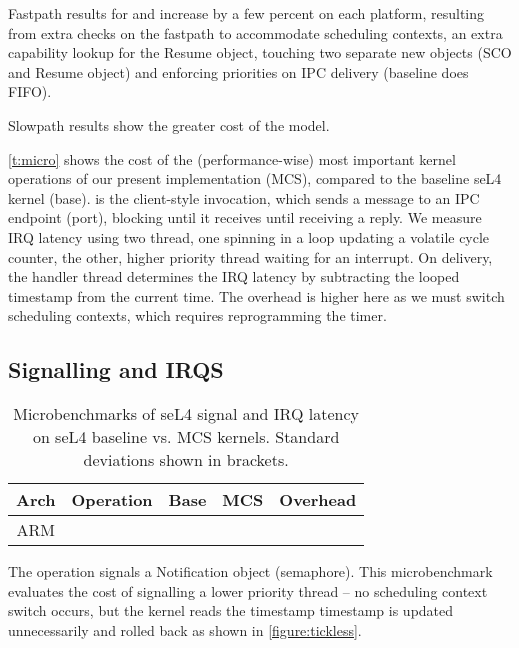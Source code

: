 Fastpath results for \call and \replyrecv increase by a few percent on each platform,
resulting from extra checks on the fastpath to
accommodate scheduling contexts, an extra capability lookup for the Resume object, touching two
separate new objects (\gls{SCO} and Resume object) and enforcing priorities
on IPC delivery (baseline does \gls{FIFO}).

Slowpath results show the greater cost of the model. 

\autoref{t:micro} shows the cost of the (performance-wise) most
important kernel operations of our present implementation (MCS), compared to
the baseline seL4 kernel (base).  is the client-style
invocation, which sends a message to an IPC endpoint (port),
 blocking until it receives until receiving a reply.
We measure IRQ latency using two thread, one spinning in a loop
updating a volatile cycle counter, the other, higher priority thread
waiting for an interrupt. On delivery, the handler thread determines the
IRQ latency by subtracting the
looped timestamp from the current time. The overhead is higher here as we must switch scheduling
contexts, which requires reprogramming the timer.

\subsection{Signalling and IRQS}

\begin{table}[h]\centering
\begin{tabular}{|c|l| r@{~}l | r@{~}l |r@{~}r|}\hline
\textbf{Arch}           & \multicolumn{1}{c|}{\textbf{Operation}}
                                & \multicolumn{2}{c|}{\textbf{Base}}
                                & \multicolumn{2}{c|}{\textbf{MCS}}
                                & \multicolumn{2}{c|}{\textbf{Overhead}} \\ \hline
\multirow{3}{*}{ARM}

\hline
\multirow{3}{*}{x64}

\hline
\end{tabular}
\caption{Microbenchmarks of seL4 signal and IRQ latency on seL4 baseline vs. MCS kernels. Standard deviations
shown in brackets.}
\label{t:micro-irq}
\end{table}

The  operation signals a Notification object (semaphore). This microbenchmark evaluates the cost of signalling a lower priority thread -- no scheduling context switch occurs, but the kernel
reads the timestamp timestamp is updated unnecessarily and rolled back as shown in \autoref{figure:tickless}.


